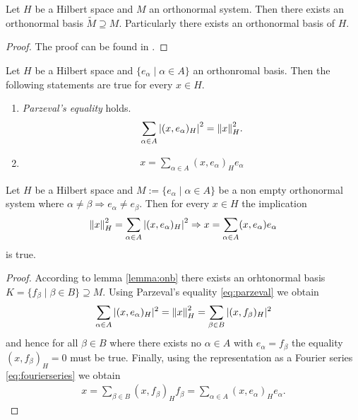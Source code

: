 \begin{lemma}\label{lemma:onb}
	Let $H$ be a Hilbert space and $M$ an orthonormal system. Then there exists an orthonormal basis $\tilde{M} \supseteq M$. Particularly there exists an orthonormal basis of $H$. 
\end{lemma}

\begin{proof}
	The proof can be found in \cite[p.52]{FAna1}.
\end{proof}

\begin{lemma}
	Let $H$ be a Hilbert space and $\{e_\alpha \mid \alpha \in A\}$ an orthonromal basis. Then the following statements are true for every $x \in H$.
	\begin{enumerate}
		\item \textit{Parzeval's equality} holds.
		\begin{align}\label{eq:parzeval}
		\sum_{\alpha \in A} \vbraces{(x, e_\alpha)_H}^2 = \norm[H]{x}^2.
		\end{align}
		
		\item 
		\begin{align} \label{eq:fourierseries}
		x = \sum_{\alpha \in A} (x, e_\alpha)_H e_\alpha
		\end{align}
	\end{enumerate} 
\end{lemma}

\begin{lemma}
	Let $H$ be a Hilbert space and $M := \{e_\alpha \mid \alpha \in A\}$ be a non empty orthonormal system where $\alpha \neq \beta \Rightarrow e_\alpha \neq e_\beta$. Then for every $x \in H$ the implication
	\begin{align}
		\norm[H]{x}^2 = \sum_{\alpha \in A} \vbraces{(x, e_\alpha)_H}^2 \Rightarrow x = \sum_{\alpha \in A} (x,e_\alpha) e_\alpha \label{eq:parceval_to_fourier}
	\end{align}
	is true.
\end{lemma}

\begin{proof}
	According to lemma \ref{lemma:onb} there exists an orhtonormal basis $K = \{f_\beta \mid \beta \in B\} \supseteq M$. Using Parzeval's equality \eqref{eq:parzeval} we obtain
	\begin{align*}
		\sum_{\alpha \in A} |(x, e_\alpha)_H|^2 = \norm[H]{x}^2 = \sum_{\beta \in B} |(x,f_\beta)_H|^2
	\end{align*}
	and hence for all $\beta \in B$ where there exists no $\alpha \in A$ with $e_\alpha = f_\beta$ the equality $(x, f_\beta)_H = 0$ must be true. Finally, using the representation as a Fourier series \eqref{eq:fourierseries} we obtain
	\begin{align*}
		x = \sum_{\beta \in B} (x,f_\beta)_H f_\beta = \sum_{\alpha \in A} (x,e_\alpha)_H e_\alpha.
	\end{align*}
\end{proof}



